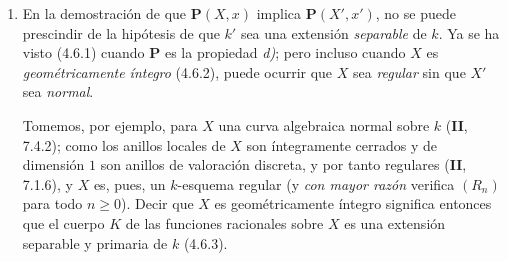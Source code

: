 \begin{remarks}[6.7.5]
\label{IV.2.s6.7.5-fr}
\begin{enumerate}
\item[(i)] En la demostración de que $\boldsymbol{P}(X,x)$ implica
$\boldsymbol{P}(X',x')$, no se puede prescindir de la hipótesis de que $k'$ sea una
extensión \emph{separable} de $k$. Ya se ha visto (4.6.1) cuando $\boldsymbol{P}$ es la
propiedad \emph{d)}; pero incluso cuando $X$ es \emph{geométricamente íntegro} (4.6.2),
puede ocurrir que $X$ sea \emph{regular} sin que $X'$ sea \emph{normal}.

Tomemos, por ejemplo, para $X$ una curva algebraica normal sobre $k$
(\textbf{II}, 7.4.2); como los anillos locales de $X$ son íntegramente cerrados y de
dimensión $1$ son anillos de valoración discreta, y por tanto regulares
(\textbf{II}, 7.1.6), y $X$ es, pues, un $k$-esquema regular (y \emph{con mayor razón}
verifica $(R_n)$ para todo $n\geqslant0$). Decir que $X$ es geométricamente
íntegro significa entonces que el cuerpo $K$ de las funciones racionales sobre
$X$ es una extensión separable y primaria de $k$ (4.6.3).


\end{enumerate}
\end{remarks}
